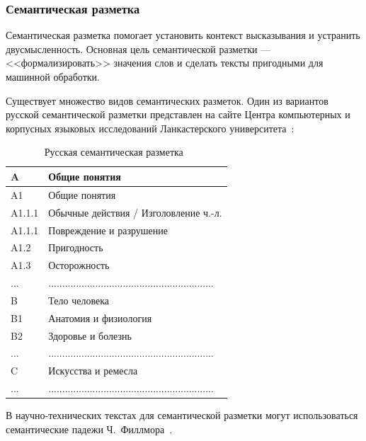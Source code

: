 \subsubsection*{Семантическая разметка}

Семантическая разметка помогает установить контекст высказывания и устранить двусмысленность. 
Основная цель семантической разметки --- <<формализировать>> значения слов и сделать тексты пригодными для машинной обработки.~\cite{butenko2022-2}

Существует множество видов семантических разметок.
Один из вариантов русской семантической разметки представлен на сайте Центра компьютерных и корпусных языковых исследований Ланкастерского университета~\cite{ucrel, cl2020}:

\begin{table}[H]
    \centering
    \begin{tabular}{|p{5cm}|p{11cm}|}
        \hline
        A & Общие понятия \\ \hline
        A1 & Общие понятия \\ \hline
        A1.1.1 & Обычные действия / Изголовление ч.-л. \\ \hline
        A1.1.1 & Повреждение и разрушение \\ \hline
        A1.2 & Пригодность \\ \hline
        A1.3 & Осторожность \\ \hline
        ... & ............................................................ \\ \hline
        B & Тело человека \\ \hline
        B1 & Анатомия и физиология \\ \hline
        B2 & Здоровье и болезнь \\ \hline
        ... & ............................................................ \\ \hline
        C & Искусства и ремесла \\ \hline
        ... & ............................................................ \\ \hline
    \end{tabular}
    \caption{Русская семантическая разметка~\cite{ucrel}}
    \label{tab:rsm}
\end{table}

В научно-технических текстах для семантической разметки могут использоваться семантические падежи Ч.~Филлмора~\cite{butenko2022-2}.


